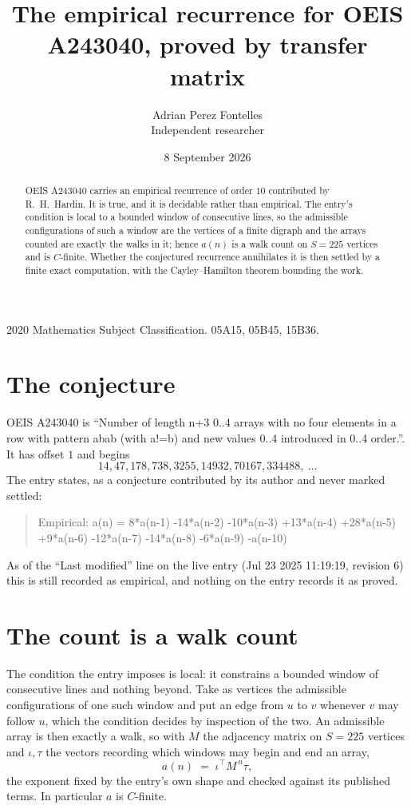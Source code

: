 \documentclass[11pt,a4paper]{article}
\title{The empirical recurrence for OEIS A243040, proved by transfer matrix}
\author{Adrian Perez Fontelles\\ \small Independent researcher}
\date{8 September 2026}
\theoremstyle{plain}
\theoremstyle{definition}
\begin{document}
\maketitle

\begin{abstract}
OEIS A243040 carries an empirical recurrence of order $10$ contributed by R.~H.~Hardin. It is
true, and it is decidable rather than empirical. The entry's condition is local to a bounded window of consecutive lines, so
the admissible configurations of such a window are the vertices of a finite digraph and the
arrays counted are exactly the walks in it; hence $a(n)$ is a walk count on $S=225$ vertices
and is $C$-finite. Whether the conjectured recurrence annihilates it is then settled by a
finite exact computation, with the Cayley--Hamilton theorem bounding the work.
\end{abstract}

\noindent\small 2020 Mathematics Subject Classification. 05A15, 05B45, 15B36.\normalsize

\section{The conjecture}

OEIS A243040 is ``Number of length n+3 0..4 arrays with no four elements in a row with pattern abab (with a!=b) and new values 0..4 introduced in 0..4 order.''. It has offset $1$ and begins
\[
14, 47, 178, 738, 3255, 14932, 70167, 334488,\ \dots
\]
The entry states, as a conjecture contributed by its author and never marked settled:
\begin{quote}
Empirical: a(n) = 8*a(n-1) -14*a(n-2) -10*a(n-3) +13*a(n-4) +28*a(n-5) +9*a(n-6) -12*a(n-7) -14*a(n-8) -6*a(n-9) -a(n-10)
\end{quote}
As of the ``Last modified'' line on the live entry (Jul 23 2025 11:19:19, revision 6) this is still
recorded as empirical, and nothing on the entry records it as proved.

\section{The count is a walk count}

The condition the entry imposes is local: it constrains a bounded window of consecutive lines and nothing beyond. Take as
vertices the admissible configurations of one such window and put an edge from $u$ to $v$
whenever $v$ may follow $u$, which the condition decides by inspection of the two. An
admissible array is then exactly a walk, so with $M$ the adjacency matrix on $S=225$ vertices
and $\iota,\tau$ the vectors recording which windows may begin and end an array,
\[
a(n)\;=\;\iota^{\!\top}M^{\,n}\tau ,
\]
the exponent fixed by the entry's own shape and checked against its published terms. In
particular $a$ is $C$-finite.
\end{document}
